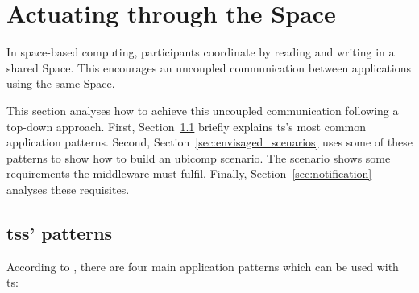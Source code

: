 
\section{Actuating through the Space}




In space-based computing, participants coordinate by reading and writing in a shared Space. %
This encourages an uncoupled communication between applications using the same Space.

This section analyses how to achieve this uncoupled communication following a top-down approach.
First, Section~\ref{sec:ts_patterns} briefly explains \acl{ts}'s most common application patterns. %
Second, Section~\ref{sec:envisaged_scenarios} uses some of these patterns to show how to build an \ac{ubicomp} scenario.
The scenario shows some requirements the middleware must fulfil.
Finally, Section~\ref{sec:notification} analyses these requisites.



\subsection{\aclp{ts}' patterns}
\label{sec:ts_patterns}

According to \citet{freeman_javaspaces_1999}, there are four main application patterns which can be used with \ac{ts}: %


